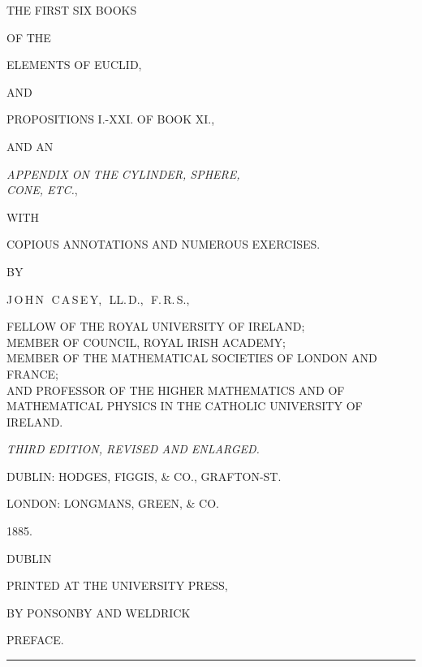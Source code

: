 \documentclass[oneside]{book}
\newcommand\imgcent[2]{
\begin{center}

\end{center}
}
\begin{document}
\newpage
\begin{center}

{\LARGE THE FIRST SIX BOOKS}\bigskip

{\small OF THE}\bigskip

{\Huge ELEMENTS OF EUCLID,}\bigskip

{\small AND}\bigskip

{\Large PROPOSITIONS I.-XXI\@. OF BOOK XI\@.,}\bigskip

{\small AND AN}\bigskip

{\Large \textit{APPENDIX ON THE CYLINDER, SPHERE,\\
CONE, E{\normalsize TC.}},}\bigskip

{\small WITH}\bigskip

COPIOUS ANNOTATIONS AND NUMEROUS EXERCISES.\bigskip

{\small BY}\medskip

{\LARGE J\,O\,H\,N\, \,C\,A\,S\,E\,Y,\, \,LL\@.\,D.,\, \,F.\,R.\,S.,}\medskip

{\small FELLOW OF THE ROYAL UNIVERSITY OF IRELAND;\\
MEMBER OF COUNCIL, ROYAL IRISH ACADEMY;\\
MEMBER OF THE MATHEMATICAL SOCIETIES OF LONDON AND FRANCE;\\
AND PROFESSOR OF THE HIGHER MATHEMATICS AND OF\\
MATHEMATICAL PHYSICS IN THE CATHOLIC UNIVERSITY OF IRELAND.}\bigskip


\imgcent{144}{f000}

\bigskip

\textit{THIRD EDITION, REVISED AND ENLARGED.}\smallskip

DUBLIN: HODGES, FIGGIS, \& CO., GRAFTON-ST.

LONDON: LONGMANS, GREEN, \& CO.

1885.

\end{center}



\newpage

\begin{center}
DUBLIN\medskip

PRINTED AT THE UNIVERSITY PRESS,\medskip

BY PONSONBY AND WELDRICK
\end{center}



\newpage
\frontmatter
\pagestyle{plain}


\begin{center}
{\LARGE PREFACE.}

\bigskip

\rule[1ex]{1.5cm}{.2pt}

\bigskip

\end{center}
\end{document}
